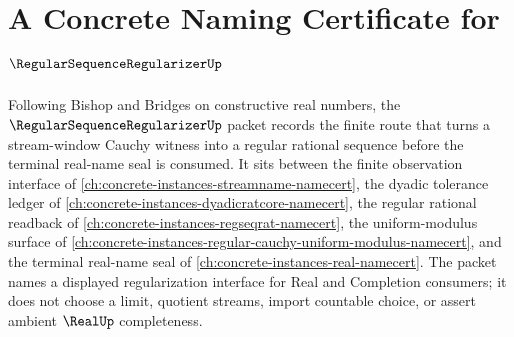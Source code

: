 \chapter{A Concrete Naming Certificate for $\RegularSequenceRegularizerUp$}
\label{ch:concrete-instances-regular-sequence-regularizer-namecert}

Following Bishop and Bridges on constructive real numbers, the $\RegularSequenceRegularizerUp$ packet records the finite route that turns a stream-window Cauchy witness into a regular rational sequence before the terminal real-name seal is consumed. It sits between the finite observation interface of \autoref{ch:concrete-instances-streamname-namecert}, the dyadic tolerance ledger of \autoref{ch:concrete-instances-dyadicratcore-namecert}, the regular rational readback of \autoref{ch:concrete-instances-regseqrat-namecert}, the uniform-modulus surface of \autoref{ch:concrete-instances-regular-cauchy-uniform-modulus-namecert}, and the terminal real-name seal of \autoref{ch:concrete-instances-real-namecert}. The packet names a displayed regularization interface for Real and Completion consumers; it does not choose a limit, quotient streams, import countable choice, or assert ambient $\RealUp$ completeness.

